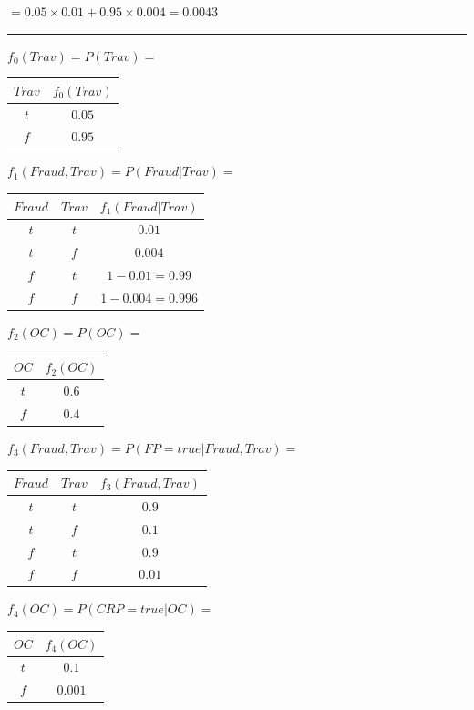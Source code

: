 \documentclass[10pt]{article}
\begin{document}
\begin{enumerate}
	$ = 0.05 \times 0.01 + 0.95 \times 0.004 = 0.0043$
	
	\noindent\rule[0.5ex]{\linewidth/2}{1pt}
	
	$f_0(Trav) = P(Trav) = $
	\begin{tabular}{|c|c|}
	\hline
 	  $Trav$ & $f_0(Trav)$ \\
	\hline
	  $t$ & $ 0.05$  \\
	\hline
	  $f$ & $0.95$ \\
	\hline
	\end{tabular}
	
	$f_1(Fraud, Trav) = P(Fraud | Trav) =$
	\begin{tabular}{|c|c|c|}
	\hline
 	  $Fraud$ & $Trav$ & $f_1(Fraud | Trav)$ \\
	\hline
	  $t$ & $t$ & $0.01$  \\
	\hline
	 $t$ & $f$ & $0.004$  \\
	\hline
	  $f$ & $t$ & $1 - 0.01 = 0.99$ \\
	\hline
	$f$ & $f$ & $1 - 0.004 = 0.996$  \\
	\hline
	\end{tabular}
	
	$f_2(OC) = P(OC) = $
	\begin{tabular}{|c|c|}
	\hline
 	  $OC$ & $f_2(OC)$ \\
	\hline
	  $t$ & $ 0.6$  \\
	\hline
	  $f$ & $0.4$ \\
	\hline
	\end{tabular}
	
	$f_3(Fraud, Trav) = P(FP = true | Fraud, Trav) = $
	\begin{tabular}{|c|c|c|}
	\hline
 	  $Fraud$ & $Trav$ & $f_3(Fraud, Trav)$ \\
	\hline
	  $t$ & $t$ & $0.9$  \\
	\hline
	 $t$ & $f$ & $0.1$  \\
	\hline
	  $f$ & $t$ & $0.9$ \\
	\hline
	$f$ & $f$ & $0.01$  \\
	\hline
	\end{tabular}
	
	$f_4(OC) = P(CRP = true | OC) = $
	\begin{tabular}{|c|c|}
	\hline
 	  $OC$ & $f_4(OC)$ \\
	\hline
	  $t$ & $ 0.1$  \\
	\hline
	  $f$ & $0.001$ \\
	\hline
	\end{tabular}
	

\end{enumerate}
\end{document}
